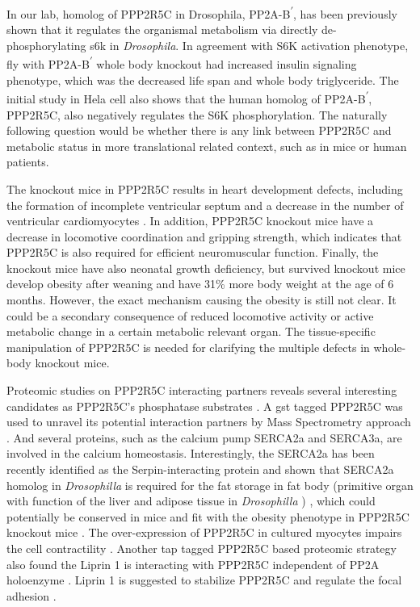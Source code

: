 In our lab, homolog of PPP2R5C in Drosophila, \gls{PP2A}-B\textsuperscript{\ensuremath{\prime}}, has been previously shown that it regulates the organismal metabolism \cite{hahn_pp2a_2010} via directly de-phosphorylating \gls{s6k} in \textit{Drosophila}. In agreement with S6K activation phenotype, fly with \gls{PP2A}-B\textsuperscript{\ensuremath{\prime}} whole body knockout had increased insulin signaling phenotype, which was the decreased life span and whole body triglyceride. The initial study in Hela cell also shows that the human homolog of \gls{PP2A}-B\textsuperscript{\ensuremath{\prime}}, PPP2R5C, also negatively regulates the S6K phosphorylation. The naturally following question would be whether there is any link between PPP2R5C and metabolic status in more translational related context, such as in mice or human patients. 

The knockout mice in PPP2R5C results in heart development defects, including the formation of incomplete ventricular septum and a decrease in the number of ventricular cardiomyocytes \cite{varadkar_protein_2014}. In addition, PPP2R5C knockout mice have a decrease in locomotive coordination and gripping strength, which indicates that PPP2R5C is also required for efficient neuromuscular function. Finally, the knockout mice have also neonatal growth deficiency, but survived knockout mice develop obesity after weaning and have 31\% more body weight at the age of 6 months. However, the exact mechanism causing the obesity is still not clear. It could be a secondary consequence of reduced locomotive activity or active metabolic change in a certain metabolic relevant organ. The tissue-specific manipulation of PPP2R5C is needed for clarifying the multiple defects in whole-body knockout mice. 

Proteomic studies on PPP2R5C interacting partners reveals several interesting candidates as PPP2R5C's phosphatase substrates \cite{arroyo_liprin_2008,zhou_proteomic_2007}. A \gls{gst} tagged PPP2R5C was used to unravel its potential interaction partners by Mass Spectrometry approach \cite{zhou_proteomic_2007}. And several proteins, such as the calcium pump SERCA2a and SERCA3a, are involved in the calcium homeostasis. Interestingly, the SERCA2a has been recently identified as the Serpin-interacting protein and shown that SERCA2a homolog in \textit{Drosophilla} is required for the fat storage in fat body (primitive organ with function of the liver and adipose tissue in \textit{Drosophilla} \cite{hietakangas_regulation_2009}) \cite{bi_seipin_2014}, which could potentially be conserved in mice and fit with the obesity phenotype in PPP2R5C knockout mice \cite{varadkar_protein_2014}. The over-expression of PPP2R5C in cultured myocytes impairs the cell contractility \cite{zhou_proteomic_2007}. Another \gls{tap} tagged PPP2R5C based proteomic strategy also found the Liprin \textalpha{}1 is interacting with PPP2R5C independent of PP2A holoenzyme \cite{arroyo_liprin_2008}. Liprin \textalpha{}1 is suggested to stabilize PPP2R5C and regulate the focal adhesion \cite{arroyo_liprin_2008}. 

